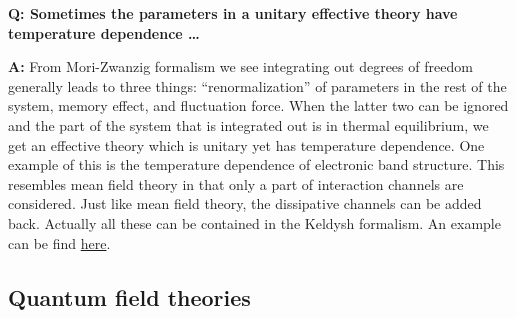 \documentclass[hyperref, a4paper]{article}
\newenvironment{qanda}{\setlength{\parindent}{0pt}}{\bigskip}
\newcommand{\Q}{\bigskip\bfseries Q: }
\newcommand{\A}{\par\textbf{A:} \normalfont}
\begin{document}
\begin{qanda}
\Q Sometimes the parameters in a unitary effective theory have temperature dependence \dots
\A From Mori-Zwanzig formalism we see integrating out degrees of freedom generally leads to three 
things: ``renormalization'' of parameters in the rest of the system, memory effect, and fluctuation
force. When the latter two can be ignored and the part of the system that is integrated out 
is in thermal equilibrium, we get an effective theory which is unitary yet has temperature 
dependence. One example of this is the temperature dependence of electronic band structure.
This resembles mean field theory in that only a part of interaction channels are considered.
Just like mean field theory, the dissipative channels can be added back. Actually all these 
can be contained in the Keldysh formalism. An example can be find \href{https://arxiv.org/pdf/1210.3623.pdf}{here}.

\end{qanda}

\subsection{Quantum field theories}
\end{document}
